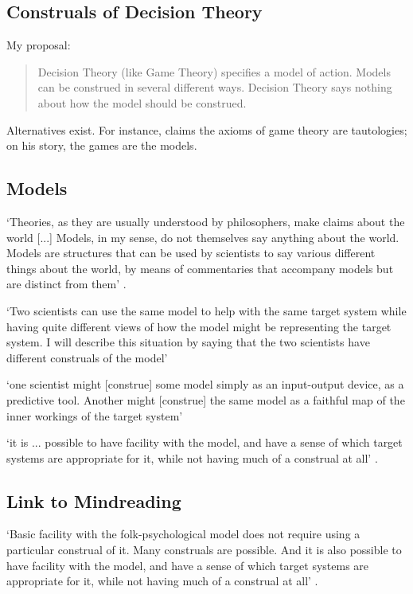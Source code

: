 \documentclass[12pt]{extarticle}
\begin{document}
\begin{multicols*}{3}
 
 
    

 
 
 
\section{Construals of Decision Theory}
 
My proposal:
\begin{quote}
Decision Theory (like Game Theory) specifies a model of action.
Models can be construed in several different ways.
Decision Theory says nothing about how the model should be construed.
\end{quote}
Alternatives exist.  For instance, \citet{binmore:1994_playing} claims the axioms
of game theory are tautologies; on his story, the games are the models.


\subsection{Models}
‘Theories, as they are usually understood by philosophers, make claims about the
world [...]
Models, in my sense, do not themselves say anything about the
world.
Models are structures that can be used by scientists to say various
different things about the world,
by means of commentaries that accompany
models but are distinct from them’
\citep[p.~4]{godfrey-smith:2005_folk}.
 
‘Two scientists can use the same model to help with the same target system while having quite different views of how the model might be representing the target system. I will describe this situation by saying that the two scientists have different construals of the model’ 
\citep[p.~4]{godfrey-smith:2005_folk}
 
‘one scientist might [construe] some model simply as an input-output device, as a
predictive tool.
 Another might [construe] the same model as a faithful map of the
inner workings of the target system’
\citep[p.~4]{godfrey-smith:2005_folk}
 
‘it is ... possible to have facility with the model, and have a sense of which target systems are appropriate for it, while not having much of a construal at all’ 
\citep[p.~5]{godfrey-smith:2005_folk}.

\subsection{Link to Mindreading}
‘Basic facility with the folk-psychological model does not require using a
particular construal of it. Many construals are possible.
And it is also possible to have facility with the model, and have a sense of which target systems are appropriate for it, while not having much of a construal at all’ 
\citep[p.~5]{godfrey-smith:2005_folk}.
 

\end{multicols*}
\end{document}
